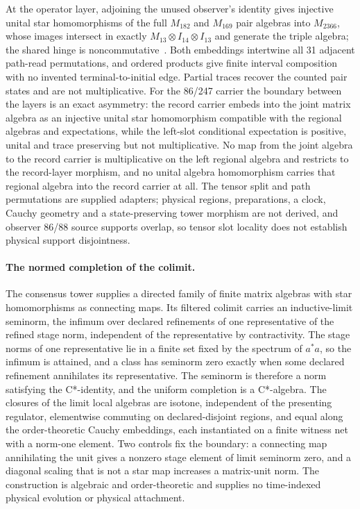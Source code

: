 \documentclass[11pt]{article}
\theoremstyle{remark}
\theoremstyle{plain}
\begin{document}
At the operator layer, adjoining the unused observer's identity gives
injective unital star homomorphisms of the full \(M_{182}\) and \(M_{169}\)
pair algebras into \(M_{2366}\), whose images intersect in exactly
\(M_{13}\otimes I_{14}\otimes I_{13}\) and generate the triple algebra; the
shared hinge is noncommutative~\cite{ophObservers}. Both embeddings
intertwine all 31 adjacent path-read permutations, and ordered products
give finite interval composition with no invented terminal-to-initial edge.
Partial traces recover the counted pair states and are not multiplicative.
For the 86/247 carrier the boundary between the layers is an exact
asymmetry: the record carrier embeds into the joint matrix algebra as an
injective unital star homomorphism compatible with the regional algebras and
expectations, while the left-slot conditional expectation is positive,
unital and trace preserving but not multiplicative. No map from the joint
algebra to the record carrier is multiplicative on the left regional algebra
and restricts to the record-layer morphism, and no unital algebra
homomorphism carries that regional algebra into the record carrier at all.
The tensor split and path permutations are supplied adapters; physical
regions, preparations, a clock, Cauchy geometry and a state-preserving tower
morphism are not derived, and observer 86/88 source supports overlap, so
tensor slot locality does not establish physical support disjointness.

\paragraph{The normed completion of the colimit.}
The consensus tower supplies a directed family of finite matrix algebras
with star homomorphisms as connecting maps. Its filtered colimit carries an
inductive-limit seminorm, the infimum over declared refinements of one
representative of the refined stage norm, independent of the
representative by contractivity. The stage norms of one representative lie
in a finite set fixed by the spectrum of \(a^*a\), so the infimum is
attained, and a class has seminorm zero exactly when some declared
refinement annihilates its representative. The seminorm is therefore a norm
satisfying the C*-identity, and the uniform completion is a C*-algebra. The
closures of the limit local algebras are isotone, independent of the
presenting regulator, elementwise commuting on declared-disjoint regions,
and equal along the order-theoretic Cauchy embeddings, each instantiated on
a finite witness net with a norm-one element. Two controls fix the boundary:
a connecting map annihilating the unit gives a nonzero stage element of
limit seminorm zero, and a diagonal scaling that is not a star map
increases a matrix-unit norm. The construction is algebraic and
order-theoretic and supplies no time-indexed physical evolution or physical
attachment.
\end{document}
